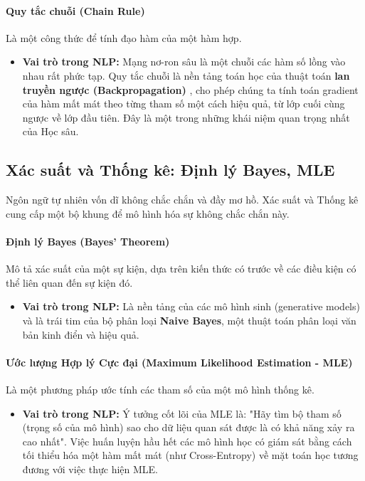 \paragraph{Quy tắc chuỗi (Chain Rule)}
Là một công thức để tính đạo hàm của một hàm hợp.
\begin{itemize}
    \item \textbf{Vai trò trong NLP:} Mạng nơ-ron sâu là một chuỗi các hàm số lồng vào nhau rất phức tạp. Quy tắc chuỗi là nền tảng toán học của thuật toán \textbf{lan truyền ngược (Backpropagation)} \cite{rumelhart1986learning}, cho phép chúng ta tính toán gradient của hàm mất mát theo từng tham số một cách hiệu quả, từ lớp cuối cùng ngược về lớp đầu tiên. Đây là một trong những khái niệm quan trọng nhất của Học sâu.
\end{itemize}

\subsection{Xác suất và Thống kê: Định lý Bayes, MLE}
\label{ssec:xac_suat_thong_ke}
Ngôn ngữ tự nhiên vốn dĩ không chắc chắn và đầy mơ hồ. Xác suất và Thống kê cung cấp một bộ khung để mô hình hóa sự không chắc chắn này.

\paragraph{Định lý Bayes (Bayes' Theorem)}
Mô tả xác suất của một sự kiện, dựa trên kiến thức có trước về các điều kiện có thể liên quan đến sự kiện đó.
\begin{itemize}
    \item \textbf{Vai trò trong NLP:} Là nền tảng của các mô hình sinh (generative models) và là trái tim của bộ phân loại \textbf{Naive Bayes}, một thuật toán phân loại văn bản kinh điển và hiệu quả.
\end{itemize}

\paragraph{Ước lượng Hợp lý Cực đại (Maximum Likelihood Estimation - MLE)}
Là một phương pháp ước tính các tham số của một mô hình thống kê.
\begin{itemize}
    \item \textbf{Vai trò trong NLP:} Ý tưởng cốt lõi của MLE là: "Hãy tìm bộ tham số (trọng số của mô hình) sao cho dữ liệu quan sát được là có khả năng xảy ra cao nhất". Việc huấn luyện hầu hết các mô hình học có giám sát bằng cách tối thiểu hóa một hàm mất mát (như Cross-Entropy) về mặt toán học tương đương với việc thực hiện MLE.
\end{itemize}

